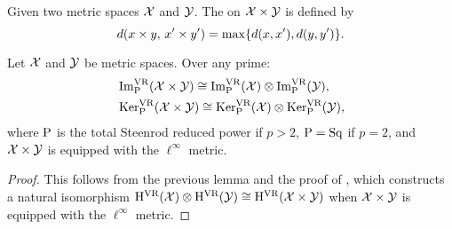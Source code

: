 \subsubsection{}

Given two metric spaces $\mathcal{X}$ and $\mathcal{Y}$.
The  on $\mathcal{X} \times \mathcal{Y}$ is defined by
\[
d(x \times y, \, x' \times y') = \max\{d(x,x'), d(y,y')\}.
\]

\medskip\theorem
Let $\mathcal{X}$ and $\mathcal{Y}$ be metric spaces.
Over any prime:
\begin{align*}
	&\operatorname{Im}^{\mathrm{VR}}_{\mathrm{P}}(\mathcal{X} \times \mathcal{Y}) \cong \operatorname{Im}^{\mathrm{VR}}_{\mathrm{P}}(\mathcal{X}) \otimes \operatorname{Im}^{\mathrm{VR}}_{\mathrm{P}}(\mathcal{Y}), \\
	&\operatorname{Ker}^{\mathrm{VR}}_{\mathrm{P}}(\mathcal{X} \times \mathcal{Y}) \cong \operatorname{Ker}^{\mathrm{VR}}_{\mathrm{P}}(\mathcal{X}) \otimes \operatorname{Ker}^{\mathrm{VR}}_{\mathrm{P}}(\mathcal{Y}),
\end{align*}
where \(\mathrm{P}\) is the total Steenrod reduced power if \(p > 2\),  \(\mathrm{P} = \mathrm{Sq}\) if \(p = 2\), and \(\mathcal{X} \times \mathcal{Y}\) is equipped with the \(\ell^\infty\) metric.


\begin{proof}
	This follows from the previous lemma and the proof of \cite[Thm.~6.1(1)]{lim2024vietoris}, which constructs a natural isomorphism $\mathrm{H}^{\mathrm{VR}}(\mathcal{X}) \otimes \mathrm{H}^{\mathrm{VR}}(\mathcal{Y}) \cong \mathrm{H}^{\mathrm{VR}}(\mathcal{X} \times \mathcal{Y})$ when \(\mathcal{X} \times \mathcal{Y}\) is equipped with the \(\ell^\infty\) metric.
\end{proof}